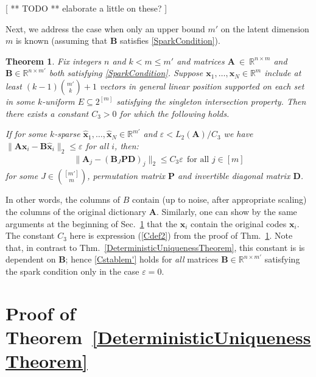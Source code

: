 \documentclass[9pt,twocolumn]{pnas-new}
\newtheorem{theorem}{Theorem}
\begin{document}
[ ** TODO ** elaborate a little on these? ]

Next, we address the case when only an upper bound $m'$ on the latent dimension $m$ is known (assuming that $\mathbf{B}$ satisfies \eqref{SparkCondition}).

\begin{theorem}\label{DeterministicUniquenessTheorem2}
Fix integers $n$ and $k < m \leq m'$ and matrices $\mathbf{A}~\in~\mathbb{R}^{n \times m}$ and $\mathbf{B} \in \mathbb{R}^{n \times m'}$ both satisfying \eqref{SparkCondition}. Suppose \mbox{$\mathbf{x}_1, \ldots, \mathbf{x}_N \in \mathbb{R}^m$} include at least \mbox{$(k-1){m' \choose k}+1$} vectors in general linear position supported on each set in some $k$-uniform $E \subseteq 2^{[m]}$ satisfying the singleton intersection property. Then there exists a constant $C_3 > 0$ for which the following holds.

If for some $k$-sparse $\mathbf{\hat x}_1, \ldots, \mathbf{\hat x}_N \in \mathbb{R}^{m'}$ and $\varepsilon < L_2(\mathbf{A}) / C_3$ we have \mbox{$\|\mathbf{A}\mathbf{x}_i - \mathbf{B}\mathbf{\hat x}_i\|_2 \leq \varepsilon$} for all $i$, then:
\begin{align}\label{Cstablem'}
\|\mathbf{A}_j-(\mathbf{B}_J\mathbf{PD})_j\|_2 \leq C_3\varepsilon \ \ \text{for all $j \in [m]$}
\end{align}
%
for some $J \in {[m'] \choose m}$, permutation matrix $\mathbf{P}$ and invertible diagonal matrix $\mathbf{D}$.
\end{theorem}

In other words, the columns of $B$ contain (up to noise, after appropriate scaling) the columns of the original dictionary $\mathbf{A}$. Similarly, one can show by the same arguments at the beginning of Sec.~\ref{DUT} that the $\mathbf{\hat x}_i$ contain the original codes $\mathbf{x}_i$. The constant $C_3$ here is expression (\ref{Cdef2}) from the proof of Thm.~\ref{DeterministicUniquenessTheorem2}. Note that, in contrast to Thm.~\ref{DeterministicUniquenessTheorem}, this constant is is dependent on $\mathbf{B}$; hence \eqref{Cstablem'} holds for \emph{all} matrices $\mathbf{B} \in \mathbb{R}^{n \times m'}$ satisfying the spark condition only in the case $\varepsilon = 0$. 

\section{Proof of Theorem~\ref{DeterministicUniquenessTheorem}}\label{DUT}
\end{document}
